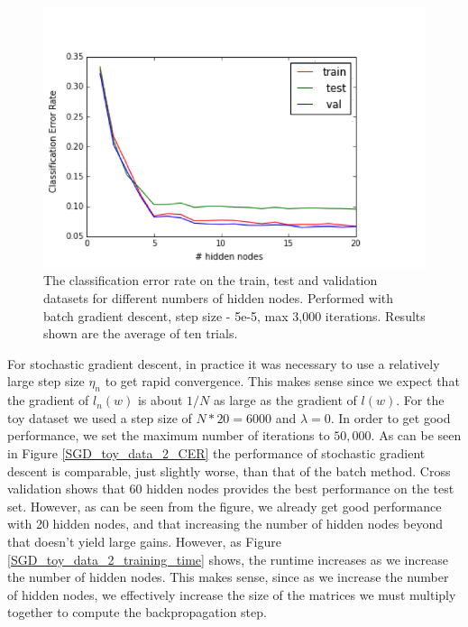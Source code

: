 \documentclass[10pt]{article}
\begin{document}
%
\begin{figure}
\centering
\includegraphics[scale=0.8]{batch_toydataset2.png}
\caption{The classification error rate on the train, test and validation datasets for different numbers of hidden nodes.  Performed with batch gradient descent, step size - 5e-5, max 3,000 iterations.  Results shown are the average of ten trials.}
\label{batch_toydataset2}
\end{figure}
%
For stochastic gradient descent, in practice it was necessary to use a relatively large step size $\eta_n$ to get rapid convergence. This makes sense since we expect that the gradient of $l_n(w)$ is about $1/N$ as large as the gradient of $l(w)$. For the toy dataset we used a step size of $N*20 = 6000$ and $\lambda = 0$. In order to get good performance, we set the maximum number of iterations to $50,000$. As can be seen in Figure \ref{SGD_toy_data_2_CER} the performance of stochastic gradient descent is comparable, just slightly worse, than that of the batch method. Cross validation shows that 60 hidden nodes provides the best performance on the test set. However, as can be seen from the figure, we already get good performance with 20 hidden nodes, and that increasing the number of hidden nodes beyond that doesn't yield large gains. However, as Figure \ref{SGD_toy_data_2_training_time} shows, the runtime increases as we increase the number of hidden nodes. This makes sense, since as we increase the number of hidden nodes, we effectively increase the size of the matrices we must multiply together to compute the backpropagation step.
%
\end{document}
